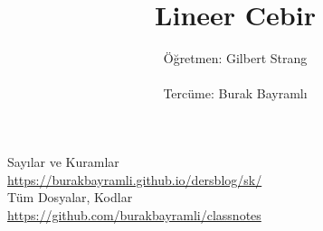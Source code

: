 \documentclass[12pt,a4paper]{report}
\title{Lineer Cebir}
\author{Öğretmen: Gilbert Strang \\ \\ Tercüme: Burak Bayramlı}
\date{}
\begin{document}
\maketitle

\newpage

\begin{figure}[!hbp]
\end{figure}


\vspace*{4cm}
\begin{center}
\vspace{0.5cm}
Sayılar ve Kuramlar\\
\vspace{0.5cm}
\url{https://burakbayramli.github.io/dersblog/sk/}\\
\vspace{0.5cm}
Tüm Dosyalar, Kodlar\\
\vspace{0.5cm}
\url{https://github.com/burakbayramli/classnotes}\\
\end{center}
\end{document}
